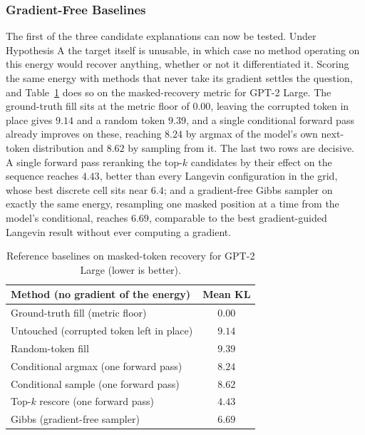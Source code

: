 \subsubsection{Gradient-Free Baselines}
\label{sec:results-baselines}

The first of the three candidate explanations can now be tested. Under Hypothesis A the target itself is unusable, in which case no method operating on this energy would recover anything, whether or not it differentiated it. Scoring the same energy with methods that never take its gradient settles the question, and Table~\ref{tab:baselines} does so on the masked-recovery metric for GPT-2 Large. The ground-truth fill sits at the metric floor of $0.00$, leaving the corrupted token in place gives $9.14$ and a random token $9.39$, and a single conditional forward pass already improves on these, reaching $8.24$ by argmax of the model's own next-token distribution and $8.62$ by sampling from it. The last two rows are decisive. A single forward pass reranking the top-$k$ candidates by their effect on the sequence reaches $4.43$, better than every Langevin configuration in the grid, whose best discrete cell sits near $6.4$; and a gradient-free Gibbs sampler on exactly the same energy, resampling one masked position at a time from the model's conditional, reaches $6.69$, comparable to the best gradient-guided Langevin result without ever computing a gradient.

\begin{table}[htbp]
    \centering
    \small
    \begin{tabular}{lc}
        \toprule
        Method (no gradient of the energy) & Mean KL \\
        \midrule
        Ground-truth fill (metric floor)        & $0.00$ \\
        Untouched (corrupted token left in place) & $9.14$ \\
        Random-token fill                        & $9.39$ \\
        Conditional argmax (one forward pass)    & $8.24$ \\
        Conditional sample (one forward pass)    & $8.62$ \\
        Top-$k$ rescore (one forward pass)       & $4.43$ \\
        Gibbs (gradient-free sampler)            & $6.69$ \\
        \bottomrule
    \end{tabular}
    \caption[Gradient-free reference baselines on masked-token recovery.]{Reference baselines on masked-token recovery for GPT-2 Large (lower is better).}
    \label{tab:baselines}
\end{table}

